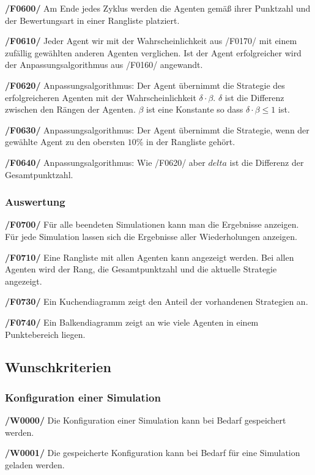 \textbf{/F0600/}
Am Ende jedes Zyklus werden die Agenten gemäß ihrer Punktzahl und der Bewertungsart in einer Rangliste platziert.

\textbf{/F0610/}
Jeder Agent wir mit der Wahrscheinlichkeit aus /F0170/ mit einem zufällig gewählten anderen Agenten verglichen. Ist der Agent erfolgreicher wird der Anpassungsalgorithmus aus /F0160/ angewandt.

\textbf{/F0620/}
Anpassungsalgorithmus: Der Agent übernimmt die Strategie des erfolgreicheren Agenten mit der Wahrscheinlichkeit $\delta \cdot \beta$. $\delta$ ist die Differenz zwischen den Rängen der Agenten. $\beta$ ist eine Konstante so dass $\delta \cdot \beta \leq 1$ ist.

\textbf{/F0630/}
Anpassungsalgorithmus: Der Agent übernimmt die Strategie, wenn der gewählte Agent zu den obersten $10\%$ in der Rangliste gehört.

\textbf{/F0640/}
Anpassungsalgorithmus: Wie /F0620/ aber $delta$ ist die Differenz der Gesamtpunktzahl.

\subsubsection{Auswertung}

\textbf{/F0700/}
Für alle beendeten Simulationen kann man die Ergebnisse anzeigen. Für jede Simulation lassen sich die Ergebnisse aller Wiederholungen anzeigen.

\textbf{/F0710/}
Eine Rangliste mit allen Agenten kann angezeigt werden. Bei allen Agenten wird der Rang, die Gesamtpunktzahl und die aktuelle Strategie angezeigt.

\textbf{/F0730/}
Ein Kuchendiagramm zeigt den Anteil der vorhandenen Strategien an.

\textbf{/F0740/}
Ein Balkendiagramm zeigt an wie viele Agenten in einem Punktebereich liegen. 

\subsection{Wunschkriterien}

\subsubsection{Konfiguration einer Simulation}

\textbf{/W0000/}
Die Konfiguration einer Simulation kann bei Bedarf gespeichert werden.

\textbf{/W0001/}
Die gespeicherte Konfiguration kann bei Bedarf für eine Simulation geladen werden.

